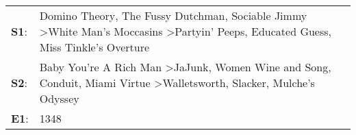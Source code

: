 \begin{supertabular}{p{0.03\textwidth}p{0.92\textwidth}}
 \textbf{S1}:  &                Domino Theory\textsuperscript{}, \enspace The Fussy Dutchman\textsuperscript{}, \enspace Sociable Jimmy\textsuperscript{} \textgreater \enspace White Man's Moccasins\textsuperscript{} \textgreater \enspace Partyin' Peeps\textsuperscript{}, \enspace Educated Guess\textsuperscript{}, \enspace Miss Tinkle's Overture\textsuperscript{}  \enspace  \\
 \textbf{S2}:  &  Baby You're A Rich Man\textsuperscript{} \textgreater \enspace JaJunk\textsuperscript{}, \enspace Women Wine and Song\textsuperscript{}, \enspace Conduit\textsuperscript{}, \enspace Miami Virtue\textsuperscript{} \textgreater \enspace Walletsworth\textsuperscript{}, \enspace Slacker\textsuperscript{}, \enspace Mulche's Odyssey\textsuperscript{}  \enspace  \\
 \textbf{E1}:  &                                                                                                                                                                                                                                                                                                                                      1348\textsuperscript{}  \enspace  \\
\end{supertabular}
